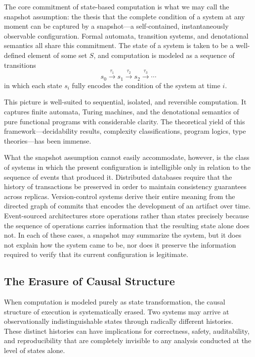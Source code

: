 \documentclass[12pt]{article}
\begin{document}
The core commitment of state-based computation is what we may call the snapshot assumption:
the thesis that the complete condition of a system at any moment can be captured by a
snapshot---a self-contained, instantaneously observable configuration. Formal automata,
transition systems, and denotational semantics all share this commitment. The state of a system
is taken to be a well-defined element of some set $S$, and computation is modeled as a sequence
of transitions
\[
s_0 \xrightarrow{\tau_1} s_1 \xrightarrow{\tau_2} s_2 \xrightarrow{\tau_3} \cdots
\]
in which each state $s_i$ fully encodes the condition of the system at time $i$.

This picture is well-suited to sequential, isolated, and reversible computation. It captures
finite automata, Turing machines, and the denotational semantics of pure functional programs
with considerable clarity. The theoretical yield of this framework---decidability results,
complexity classifications, program logics, type theories---has been immense.

What the snapshot assumption cannot easily accommodate, however, is the class of systems in
which the present configuration is intelligible only in relation to the sequence of events that
produced it. Distributed databases require that the history of transactions be preserved in
order to maintain consistency guarantees across replicas. Version-control systems derive their
entire meaning from the directed graph of commits that encodes the development of an artifact
over time. Event-sourced architectures store operations rather than states precisely because the
sequence of operations carries information that the resulting state alone does not. In each of
these cases, a snapshot may summarize the system, but it does not explain how the system came
to be, nor does it preserve the information required to verify that its current configuration is
legitimate.

\subsection{The Erasure of Causal Structure}

When computation is modeled purely as state transformation, the causal structure of execution
is systematically erased. Two systems may arrive at observationally indistinguishable states
through radically different histories. These distinct histories can have implications for
correctness, safety, auditability, and reproducibility that are completely invisible to any
analysis conducted at the level of states alone.
\end{document}
